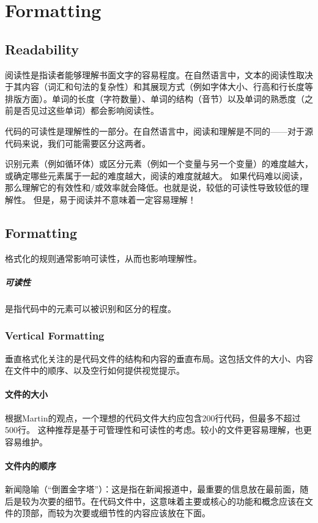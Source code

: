 \chapter{Formatting}

\section{Readability}
阅读性是指读者能够理解书面文字的容易程度。在自然语言中，文本的阅读性取决于其内容（词汇和句法的复杂性）和其展现方式（例如字体大小、行高和行长度等排版方面）。单词的长度（字符数量）、单词的结构（音节）以及单词的熟悉度（之前是否见过这些单词）都会影响阅读性。

代码的可读性是理解性的一部分。在自然语言中，阅读和理解是不同的——对于源代码来说，我们可能需要区分这两者。

识别元素（例如循环体）或区分元素（例如一个变量与另一个变量）的难度越大，或确定哪些元素属于一起的难度越大，阅读的难度就越大。
如果代码难以阅读，那么理解它的有效性和/或效率就会降低。也就是说，较低的可读性导致较低的理解性。
但是，易于阅读并不意味着一定容易理解！

\section{Formatting}
格式化的规则通常影响可读性，从而也影响理解性。

\paragraph{可读性}是指代码中的元素可以被识别和区分的程度。

\subsection{Vertical Formatting}

垂直格式化关注的是代码文件的结构和内容的垂直布局。这包括文件的大小、内容在文件中的顺序、以及空行如何提供视觉提示。

\subsubsection{文件的大小}
根据Martin的观点，一个理想的代码文件大约应包含200行代码，但最多不超过500行。
这种推荐是基于可管理性和可读性的考虑。较小的文件更容易理解，也更容易维护。
\subsubsection{文件内的顺序}
新闻隐喻（“倒置金字塔”）：这是指在新闻报道中，最重要的信息放在最前面，随后是较为次要的细节。在代码文件中，这意味着主要或核心的功能和概念应该在文件的顶部，而较为次要或细节性的内容应该放在下面。

